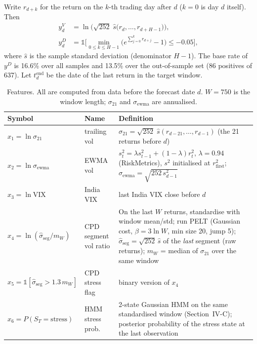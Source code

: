 \documentclass[10pt,twocolumn]{article}
\makeatletter
\renewcommand{\subsection}{\@startsection{subsection}{2}{0pt}{5pt}{2pt}{\normalfont\small\itshape}}
\newcommand{\ind}{\mathbb{1}}
\makeatother
\begin{document}
\subsection{Targets}
Write $r_{d+k}$ for the return on the $k$-th trading day after $d$ ($k=0$ is day $d$ itself). Then
\begin{align}
y^{V}_d&=\ln\!\Big(\sqrt{252}\;\hat s\big(r_{d},\dots,r_{d+H-1}\big)\Big),\\
y^{D}_d&=\ind\!\Big[\min_{0\le k\le H-1}\Big(e^{\sum_{j=0}^{k}r_{d+j}}-1\Big)\le-0.05\Big],
\end{align}
where $\hat s$ is the sample standard deviation (denominator $H-1$). The base rate of $y^D$ is 16.6\% over all samples and 13.5\% over the out-of-sample set (86 positives of 637). Let $t^{\mathrm{end}}_d$ be the date of the last return in the target window.

\begin{table}[t]\centering\caption{Features. All are computed from data before the forecast date $d$. $W=750$ is the window length; $\sigma_{21}$ and $\sigma_{\mathrm{ewma}}$ are annualised.}\label{tab:feat}
\footnotesize\begin{tabular}{@{}llp{4.6in}@{}}\toprule
Symbol & Name & Definition\\\midrule
$x_1=\ln\sigma_{21}$ & trailing vol & $\sigma_{21}=\sqrt{252}\;\hat s(r_{d-21},\dots,r_{d-1})$ (the 21 returns before $d$)\\
$x_2=\ln\sigma_{\mathrm{ewma}}$ & EWMA vol & $s_t^2=\lambda s_{t-1}^2+(1-\lambda)r_t^2$, $\lambda=0.94$ (RiskMetrics), $s^2$ initialised at $r_{\mathrm{first}}^2$; $\sigma_{\mathrm{ewma}}=\sqrt{252\,s^2_{d-1}}$\\
$x_3=\ln \mathrm{VIX}$ & India VIX & last India VIX close before $d$\\
$x_4=\ln(\hat\sigma_{\mathrm{seg}}/m_W)$ & CPD segment vol ratio & On the last $W$ returns, standardise with window mean/std; run PELT (Gaussian cost, $\beta=3\ln W$, min size 20, jump 5); $\hat\sigma_{\mathrm{seg}}=\sqrt{252}\,\hat s$ of the \emph{last} segment (raw returns); $m_W$ = median of $\sigma_{21}$ over the same window\\
$x_5=\ind[\hat\sigma_{\mathrm{seg}}>1.3\,m_W]$ & CPD stress flag & binary version of $x_4$\\
$x_6=P(S_T{=}\text{stress})$ & HMM stress prob. & 2-state Gaussian HMM on the same standardised window (Section~IV-C); posterior probability of the stress state at the last observation\\\bottomrule
\end{tabular}\end{table}
\end{document}
